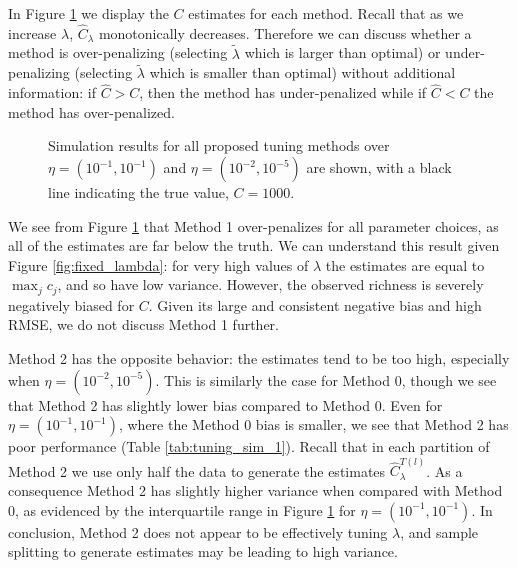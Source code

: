 \documentclass[12pt]{article}
\theoremstyle{break}
\theoremstyle{break}
\begin{document}
In Figure \ref{fig:tuning_sim_1} we display the $C$ estimates for each method.  Recall that as we increase $\lambda$, $\widehat{C}_\lambda$ monotonically decreases.  Therefore we can discuss whether a method is over-penalizing (selecting $\widetilde{\lambda}$ which is larger than optimal) or under-penalizing (selecting $\widetilde{\lambda}$ which is smaller than optimal) without additional information: if $\widehat{C} > C$, then the method has under-penalized while if $\widehat{C} < C$ the method has over-penalized.



\begin{figure}[t]
\caption{Simulation results for all proposed tuning methods over $\eta = (10^{-1}, 10^{-1})$ and $\eta = (10^{-2}, 10^{-5})$ are shown, with a black line indicating the true value, $C = 1000$.
\label{fig:tuning_sim_1}}
\centering{}
\end{figure}

We see from Figure \ref{fig:tuning_sim_1} that Method 1 over-penalizes for all parameter choices, as all of the estimates are far below the truth. We can understand this result given Figure \ref{fig:fixed_lambda}: for very high values of $\lambda$ the estimates are equal to $\max_j c_j$, and so have low variance. However, the observed richness is severely negatively biased for $C$. Given its large and consistent negative bias and high RMSE, we do not discuss  Method 1 further.

Method 2 has the opposite behavior: the estimates tend to be too high, especially when $\eta = (10^{-2}, 10^{-5})$. This is similarly the case for Method 0, though we see that Method 2 has slightly lower bias compared to Method 0.  %
Even for $\eta = (10^{-1}, 10^{-1})$, where the Method 0 bias is smaller, we see that Method 2 has poor performance (Table \ref{tab:tuning_sim_1}).  Recall that in each partition of Method 2 we use only half the data to generate the estimates $\widehat{C}^{T(l)}_{\lambda}$.  As a consequence Method 2 has slightly higher variance when compared with Method 0, as evidenced by the interquartile range in Figure \ref{fig:tuning_sim_1} for $\eta = (10^{-1}, 10^{-1})$.  In conclusion, Method 2 does not appear to be effectively
tuning $\lambda$, and sample splitting to generate estimates may be leading to high variance.
\end{document}
